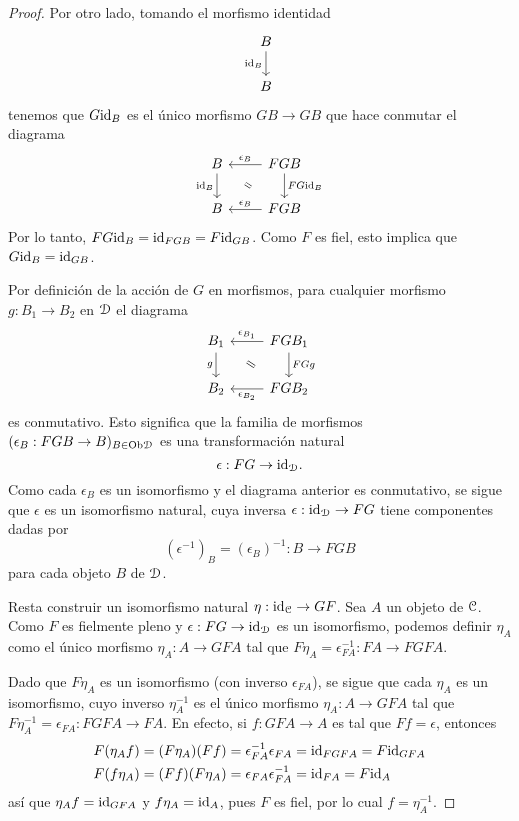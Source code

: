 \begin{proof}
    Por otro lado, tomando el morfismo identidad
    \[
        \begin{tikzcd}
            B \ar[d,"\id_B"'] \\
            B
        \end{tikzcd}
    \]
    tenemos que $G\id_B$ es el único morfismo $GB\to GB$ que hace conmutar
    el diagrama
    \[
        \begin{tikzcd}
            B \ar[d,"\id_B"'] & FGB \ar[l,"\epsilon_B"'] \ar[d,"FG\id_B"] \\
            B & FGB \ar[l,"\epsilon_B"']
            \com{1-1}{2-2}
        \end{tikzcd}
    \]
    Por lo tanto, $FG\id_B=\id_{FGB}=F\id_{GB}$.
    Como $F$ es fiel, esto implica que $G\id_B =\id_{GB}$.
    
    Por definición de la acción de $G$ en morfismos, para cualquier morfismo
    $g:B_1\to B_2$ en $\cal D$ el diagrama
    \[
        \begin{tikzcd}
            B_1 \ar[d,"g"']
            & FGB_1 \ar[l,"\epsilon_{B_1}"'] \ar[d,"FGg"] \\
            B_2 & FGB_2 \ar[l,"\epsilon_{B_2}"]
            \com{1-1}{2-2}
        \end{tikzcd}
    \]
    es conmutativo.
    Esto significa que la familia de morfismos $(\epsilon_B:FGB\to B)_{B\in\Ob\cal D}$
    es una transformación natural
    \[
        \epsilon : FG\to \id_{\cal D}
    .\]
    Como cada $\epsilon_B$ es un isomorfismo y el diagrama anterior
    es conmutativo, se sigue que $\epsilon$ es un
    isomorfismo natural, cuya inversa
    $\epsilon:\id_{\cal D}\to FG$ tiene componentes dadas por
    \[
        (\epsilon^{-1})_B = (\epsilon_B)^{-1}:B\to FGB
    \]
    para cada objeto $B$ de $\cal D$.
    
    Resta construir un isomorfismo natural $\eta:\id_{\cal C}\to GF$.
    Sea $A$ un objeto de $\cal C$.
    Como $F$ es fielmente pleno y $\epsilon:FG\to\id_{\cal D}$ es un
    isomorfismo, podemos definir $\eta_A$ como el único morfismo
    $\eta_A:A\to GFA$ tal que $F\eta_A=\epsilon_{FA}^{-1}:FA\to FGFA$.
    
    Dado que $F\eta_A$ es un isomorfismo (con inverso $\epsilon_{FA}$),
    se sigue que cada $\eta_A$ es un isomorfismo, cuyo inverso $\eta_A^{-1}$ es el
    único morfismo $\eta_A:A\to GFA$ tal que $F\eta_A^{-1}=\epsilon_{FA}:FGFA\to FA$.
    En efecto, si $f:GFA\to A$ es tal que $Ff=\epsilon$, entonces
    \begin{align*}
        F(\eta_Af)
        &=(F\eta_A)(Ff)=\epsilon_{FA}^{-1}\epsilon_{FA}=\id_{FGFA}=F\id_{GFA} \\
        F(f\eta_A)
        &=(Ff)(F\eta_A)=\epsilon_{FA}\epsilon_{FA}^{-1}=\id_{FA}=F\id_A
    \end{align*}
    así que $\eta_Af=\id_{GFA}$ y $f\eta_A=\id_A$, pues $F$ es fiel,
    por lo cual $f=\eta_A^{-1}$.
    

\end{proof}
